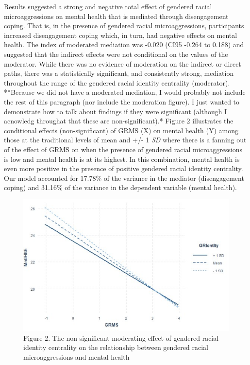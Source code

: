 \documentclass[
  english,
]{book}
\begin{document}
Results suggested a strong and negative total effect of gendered racial microaggressions on mental health that is mediated through disengagement coping. That is, in the presence of gendered racial microaggressions, participants increased disengagement coping which, in turn, had negative effects on mental health. The index of moderated mediation was -0.020 (CI95 -0.264 to 0.188) and suggested that the indirect effects were not conditional on the values of the moderator. While there was no evidence of moderation on the indirect or direct paths, there was a statistically significant, and consistently strong, mediation throughout the range of the gendered racial identity centrality (moderator). **Because we did not have a moderated mediation, I would probably not include the rest of this paragraph (nor include the moderation figure). I just wanted to demonstrate how to talk about findings if they were significant (although I acnowledg throughat that these are non-significant).* Figure 2 illustrates the conditional effects (non-significant) of GRMS (X) on mental health (Y) among those at the traditional levels of mean and +/- 1 \emph{SD} where there is a fanning out of the effect of GRMS on when the presence of gendered racial microaggressions is low and mental health is at its highest. In this combination, mental health is even more positive in the presence of positive gendered racial identity centrality. Our model accounted for 17.78\% of the variance in the mediator (disengagement coping) and 31.16\% of the variance in the dependent variable (mental health).

\begin{figure}
\centering
\includegraphics{images/Modmed/GRMS_MH_GRIC.jpg}
\caption{Figure 2. The non-significant moderating effect of gendered racial identity centrality on the relationship between gendered racial microaggressions and mental health}
\end{figure}
\end{document}
